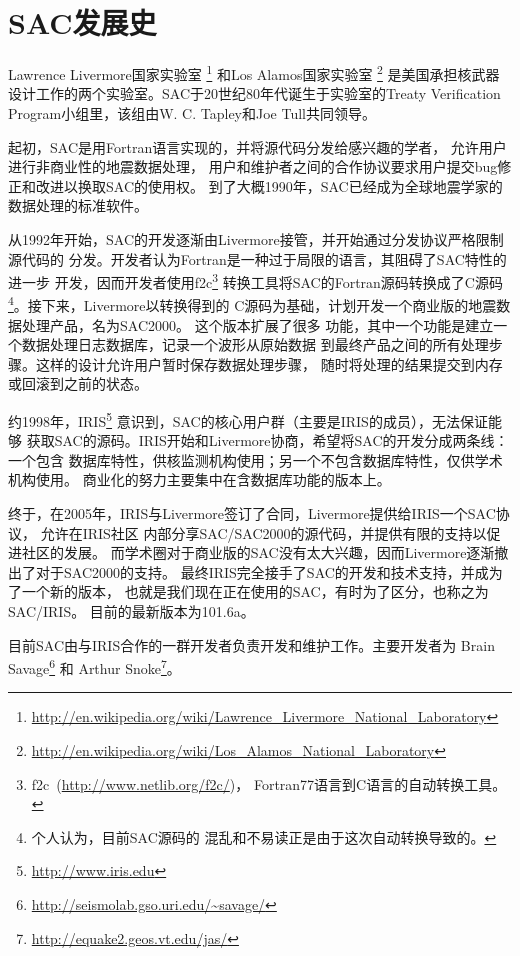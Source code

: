 \section{SAC发展史}
\label{sec:history}

Lawrence Livermore国家实验室
\footnote{\url{http://en.wikipedia.org/wiki/Lawrence\_Livermore\_National\_Laboratory}}
和Los Alamos国家实验室
\footnote{\url{http://en.wikipedia.org/wiki/Los\_Alamos\_National\_Laboratory}}
是美国承担核武器设计工作的两个实验室。SAC于20世纪80年代诞生于实验室的Treaty Verification Program小组里，该组由W. C. Tapley和Joe Tull共同领导。

起初，SAC是用Fortran语言实现的，并将源代码分发给感兴趣的学者，
允许用户进行非商业性的地震数据处理，
用户和维护者之间的合作协议要求用户提交bug修正和改进以换取SAC的使用权。
到了大概1990年，SAC已经成为全球地震学家的数据处理的标准软件。

从1992年开始，SAC的开发逐渐由Livermore接管，并开始通过分发协议严格限制源代码的
分发。开发者认为Fortran是一种过于局限的语言，其阻碍了SAC特性的进一步
开发，因而开发者使用f2c\footnote{f2c~(\url{http://www.netlib.org/f2c/})，
Fortran77语言到C语言的自动转换工具。}
转换工具将SAC的Fortran源码转换成了C源码\footnote{个人认为，目前SAC源码的
混乱和不易读正是由于这次自动转换导致的。}。接下来，Livermore以转换得到的
C源码为基础，计划开发一个商业版的地震数据处理产品，名为SAC2000。
这个版本扩展了很多
功能，其中一个功能是建立一个数据处理日志数据库，记录一个波形从原始数据
到最终产品之间的所有处理步骤。这样的设计允许用户暂时保存数据处理步骤，
随时将处理的结果提交到内存或回滚到之前的状态。

约1998年，IRIS\footnote{\url{http://www.iris.edu}}
意识到，SAC的核心用户群（主要是IRIS的成员），无法保证能够
获取SAC的源码。IRIS开始和Livermore协商，希望将SAC的开发分成两条线：一个包含
数据库特性，供核监测机构使用；另一个不包含数据库特性，仅供学术机构使用。
商业化的努力主要集中在含数据库功能的版本上。

终于，在2005年，IRIS与Livermore签订了合同，Livermore提供给IRIS一个SAC协议，
允许在IRIS社区
内部分享SAC/SAC2000的源代码，并提供有限的支持以促进社区的发展。
而学术圈对于商业版的SAC没有太大兴趣，因而Livermore逐渐撤出了对于SAC2000的支持。
最终IRIS完全接手了SAC的开发和技术支持，并成为了一个新的版本，
也就是我们现在正在使用的SAC，有时为了区分，也称之为SAC/IRIS。
目前的最新版本为101.6a。

目前SAC由与IRIS合作的一群开发者负责开发和维护工作。主要开发者为
Brain Savage\footnote{\url{http://seismolab.gso.uri.edu/~savage/}}
和
Arthur Snoke\footnote{\url{http://equake2.geos.vt.edu/jas/}}。
